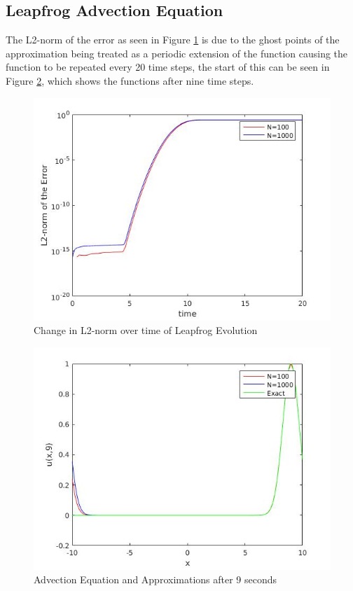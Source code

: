 \subsection{Leapfrog Advection Equation}
The L2-norm of the error as seen in Figure \ref{leapfrog_adv_l2} is due to the ghost points of the approximation being treated as a periodic extension of the function causing the function to be repeated every 20 time steps, the start of this can be seen in Figure \ref{leapfrog_adv}, which shows the functions after nine time steps.
\begin{figure}[H] 
 \includegraphics[scale=0.5]{Images/leapfrog_adv_l2.jpg}
 \caption{Change in L2-norm over time of Leapfrog Evolution}
 \label{leapfrog_adv_l2}
\end{figure}
\begin{figure}[H]
 \includegraphics[scale=0.5]{Images/leapfrog_adv.jpg}
 \caption{Advection Equation and Approximations after 9 seconds}
 \label{leapfrog_adv}
\end{figure}
